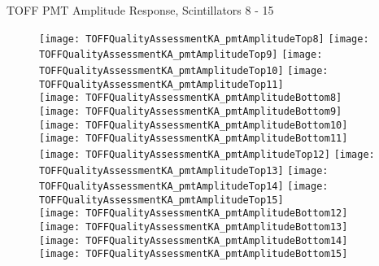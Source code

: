 \documentclass[11pt]{beamer}
\begin{document}
\begin{frame}{TOFF PMT Amplitude Response, Scintillators 8 - 15}
\begin{figure}
\centering
\texttt{[image: TOFFQualityAssessmentKA\_pmtAmplitudeTop8]}
\texttt{[image: TOFFQualityAssessmentKA\_pmtAmplitudeTop9]}
\texttt{[image: TOFFQualityAssessmentKA\_pmtAmplitudeTop10]}
\texttt{[image: TOFFQualityAssessmentKA\_pmtAmplitudeTop11]} \\ 
\texttt{[image: TOFFQualityAssessmentKA\_pmtAmplitudeBottom8]}
\texttt{[image: TOFFQualityAssessmentKA\_pmtAmplitudeBottom9]}
\texttt{[image: TOFFQualityAssessmentKA\_pmtAmplitudeBottom10]}
\texttt{[image: TOFFQualityAssessmentKA\_pmtAmplitudeBottom11]} \\
\texttt{[image: TOFFQualityAssessmentKA\_pmtAmplitudeTop12]}
\texttt{[image: TOFFQualityAssessmentKA\_pmtAmplitudeTop13]}
\texttt{[image: TOFFQualityAssessmentKA\_pmtAmplitudeTop14]}
\texttt{[image: TOFFQualityAssessmentKA\_pmtAmplitudeTop15]} \\
\texttt{[image: TOFFQualityAssessmentKA\_pmtAmplitudeBottom12]}
\texttt{[image: TOFFQualityAssessmentKA\_pmtAmplitudeBottom13]}
\texttt{[image: TOFFQualityAssessmentKA\_pmtAmplitudeBottom14]}
\texttt{[image: TOFFQualityAssessmentKA\_pmtAmplitudeBottom15]} \\
\end{figure}
\end{frame}
\end{document}
